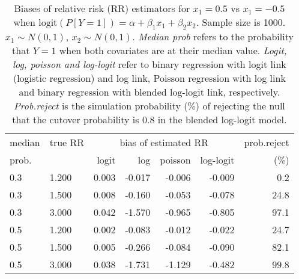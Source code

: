 \documentclass[12pt,a4paper]{article}
\begin{document}
\begin{table}[H] 
\small\sf\centering 
\caption{Biases of relative risk (RR) estimators for $x_1=0.5$ vs $x_1=-0.5$ when $\mbox{logit}(P[Y=1])=\alpha+\beta_1 x_1 + \beta_2 x_2$. Sample size is 1000. $x_1 \sim $$N(0,1)$, $x_2 \sim N(0,1)$. {\it Median prob} refers to the probability that $Y=1$ when both covariates are at their median value. {\it Logit, log, poisson and log-logit} refer to binary regression with logit link (logistic regression) and log link, Poisson regression with log link and binary regression with blended log-logit link, respectively. {\it Prob.reject} is the simulation probability (\%) of rejecting the null that the cutover probability is $0.8$ in the blended log-logit model.} 
\begin{tabular}{llrrrrr} 
\toprule 
median & true RR & \multicolumn{4}{c}{bias of estimated RR} & prob.reject \\ 
prob. & & logit & log & poisson & log-logit  & (\%) \\ \midrule 
0.3 & 1.200 & 0.003 & -0.017 & -0.006 & -0.009 &  0.2 \\  
0.3 & 1.500 & 0.008 & -0.160 & -0.053 & -0.078 & 24.8 \\  
0.3 & 3.000 & 0.042 & -1.570 & -0.965 & -0.805 & 97.1 \\  
0.5 & 1.200 & 0.002 & -0.083 & -0.012 & -0.022 & 24.7 \\  
0.5 & 1.500 & 0.005 & -0.266 & -0.084 & -0.090 & 82.1 \\  
0.5 & 3.000 & 0.038 & -1.731 & -1.129 & -0.482 & 99.8 \\  
\bottomrule 
\end{tabular} 
\end{table} 
\end{document}
